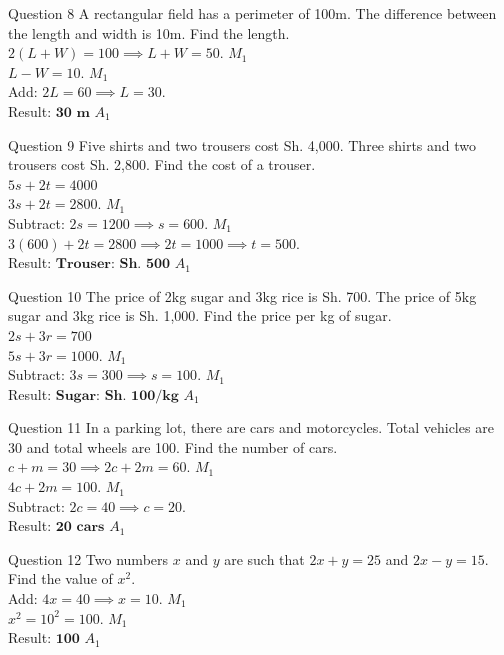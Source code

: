 \documentclass[12pt, a4paper, oneside]{article}
\begin{document}
\begin{solvingbox}{Question 8}
A rectangular field has a perimeter of 100m. The difference between the length and width is 10m. Find the length. \\
$2(L + W) = 100 \implies L + W = 50$. \hfill $M_1$ \\
$L - W = 10$. \hfill $M_1$ \\
Add: $2L = 60 \implies L = 30$. \\
Result: $\mathbf{30\text{ m}}$ \hfill $A_1$
\end{solvingbox}

\begin{solvingbox}{Question 9}
Five shirts and two trousers cost Sh. 4,000. Three shirts and two trousers cost Sh. 2,800. Find the cost of a trouser. \\
$5s + 2t = 4000$ \\
$3s + 2t = 2800$. \hfill $M_1$ \\
Subtract: $2s = 1200 \implies s = 600$. \hfill $M_1$ \\
$3(600) + 2t = 2800 \implies 2t = 1000 \implies t = 500$. \\
Result: $\mathbf{\text{Trouser: Sh. 500}}$ \hfill $A_1$
\end{solvingbox}

\begin{solvingbox}{Question 10}
The price of 2kg sugar and 3kg rice is Sh. 700. The price of 5kg sugar and 3kg rice is Sh. 1,000. Find the price per kg of sugar. \\
$2s + 3r = 700$ \\
$5s + 3r = 1000$. \hfill $M_1$ \\
Subtract: $3s = 300 \implies s = 100$. \hfill $M_1$ \\
Result: $\mathbf{\text{Sugar: Sh. 100/kg}}$ \hfill $A_1$
\end{solvingbox}

\begin{solvingbox}{Question 11}
In a parking lot, there are cars and motorcycles. Total vehicles are 30 and total wheels are 100. Find the number of cars. \\
$c + m = 30 \implies 2c + 2m = 60$. \hfill $M_1$ \\
$4c + 2m = 100$. \hfill $M_1$ \\
Subtract: $2c = 40 \implies c = 20$. \\
Result: $\mathbf{20 \text{ cars}}$ \hfill $A_1$
\end{solvingbox}

\begin{solvingbox}{Question 12}
Two numbers $x$ and $y$ are such that $2x + y = 25$ and $2x - y = 15$. Find the value of $x^2$. \\
Add: $4x = 40 \implies x = 10$. \hfill $M_1$ \\
$x^2 = 10^2 = 100$. \hfill $M_1$ \\
Result: $\mathbf{100}$ \hfill $A_1$
\end{solvingbox}
\newpage
\end{document}
